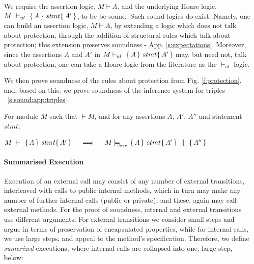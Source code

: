 \label{sect:prove:triples:sound}
We require the assertion logic,  $M\vdash A$, and  the  underlying Hoare logic,  $M\ \vdash_{ul}\  \triple A {stmt} {A'}$,   to be be  sound. 
Such  sound logics do exist.
Namely, one can build an assertion logic, $M\vdash A$, by extending a logic which does not talk about protection, through the addition of structural rules which talk about protection; this extension preserves soundness - \cf  App. \ref{s:expectations}. 
Moreover,  since the assertions $A$ and $A'$ in $M \vdash_{ul}\   \{\, A \, \}\ stmt \{\, A' \, \}$ may, but need not, talk about protection, 
one can take a Hoare logic from the literature as the $ \vdash_{ul}$-logic.

We then prove   soundness of the rules about protection from Fig. \ref{f:protection}, and, based on this, 
we prove soundness of the inference system for triples  -- \cf \A\ \ref{s:sound:app:triples}.

 

\begin{Theorem}
\label{l:triples:sound}
For module  $M$   such that  $\vdash M$, and for any assertions $A$,  $A'$, $A''$ and statement  $stmt$:
\begin{center}
$M\ \vdash\  \triple A {stmt} {A'}  \ \ \ \  \Longrightarrow  \ \ \ \ \satisfiesD {M} {\quadruple {A} {stmt} {A'} {A''}}$
\end{center}
\end{Theorem}
 

\paragraph{Summarised Execution}
\label{s:summaized}
Execution of an external call may consist of any number of external
transitions, interleaved with calls to public internal methods, which in
turn may make any number of further internal calls (public or private),  %
and these, again may call external methods.
For the   proof of soundness,  internal and external transitions use different arguments.
 For  external transitions we consider small steps  and  argue in terms of  preservation of  encapsulated properties,
while for internal calls, we use large steps, and appeal to the method's specification.
Therefore, we define  \emph{sumarized} executions, where  internal calls are collapsed into one, large step, \eg below:
  

\label{sect:termExecs}


